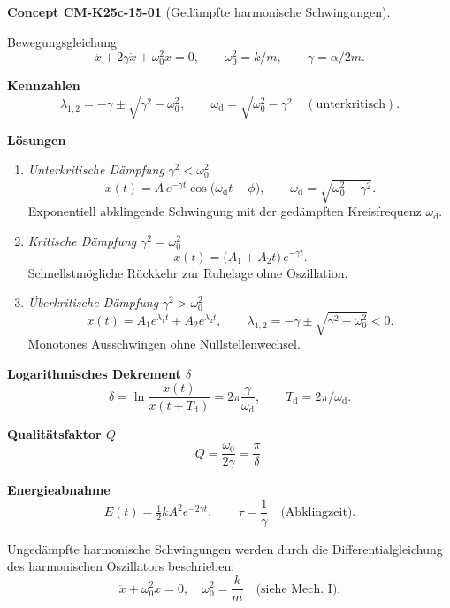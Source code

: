 \documentclass[10pt, letterpaper]{article}
\newcommand{\CustomHeading}[3]{%
  \par\medskip\noindent%
  \textbf{#1 #2} \textnormal{(#3)}.\enskip%
}
\newenvironment{CONC}[2]{\begin{unitbox}\CustomHeading{Concept}{#1}{#2}}{\end{unitbox}}
\begin{document}
\begin{CONC}{CM-K25c-15-01}{Gedämpfte harmonische Schwingungen}
Bewegungsgleichung  
\[
\ddot x + 2\gamma\dot x + \omega_{0}^{2}x = 0,
\qquad
\omega_{0}^{2}=k/m,
\qquad
\gamma=\alpha/2m .
\]

\textbf{Kennzahlen}  
\[
\lambda_{1,2}=-\gamma\pm\sqrt{\gamma^{2}-\omega_{0}^{2}},
\qquad
\omega_{\text{d}}=\sqrt{\omega_{0}^{2}-\gamma^{2}}\quad
(\text{unterkritisch}) .
\]

\textbf{Lösungen}

\begin{enumerate}
  \item \emph{Unterkritische Dämpfung} \(\gamma^{2}<\omega_{0}^{2}\)  
        \[
          x(t)=A\,e^{-\gamma t}\cos\!\bigl(\omega_{\mathrm d}t-\phi\bigr),
          \qquad
          \omega_{\mathrm d}=\sqrt{\omega_{0}^{2}-\gamma^{2}} .
        \]
        Exponentiell abklingende Schwingung mit der gedämpften Kreisfrequenz
        \(\omega_{\mathrm d}\).

  \item \emph{Kritische Dämpfung} \(\gamma^{2}=\omega_{0}^{2}\)  
        \[
          x(t)=\bigl(A_{1}+A_{2}t\bigr)\,e^{-\gamma t}.
        \]
        Schnellstmögliche Rückkehr zur Ruhelage ohne Oszillation.

  \item \emph{Überkritische Dämpfung} \(\gamma^{2}>\omega_{0}^{2}\)  
        \[
          x(t)=A_{1}e^{\lambda_{1}t}+A_{2}e^{\lambda_{2}t},
          \qquad
          \lambda_{1,2}=-\gamma\pm\sqrt{\gamma^{2}-\omega_{0}^{2}}<0 .
        \]
        Monotones Ausschwingen ohne Nullstellenwechsel.
\end{enumerate}


\textbf{Logarithmisches Dekrement \(\delta\)}  
\[
\delta=\ln\frac{x(t)}{x(t+T_{\text{d}})}
      =2\pi\frac{\gamma}{\omega_{\text{d}}},
\qquad
T_{\text{d}}=2\pi/\omega_{\text{d}} .
\]

\textbf{Qualitätsfaktor \(Q\)}  
\[
Q=\frac{\omega_{0}}{2\gamma}
  =\frac{\pi}{\delta}.
\]

\textbf{Energieabnahme}  
\[
E(t)=\tfrac12kA^{2}e^{-2\gamma t},
\qquad
\tau=\frac{1}{\gamma}\quad\text{(Abklingzeit)}.
\]
\end{CONC}






Ungedämpfte harmonische Schwingungen werden durch die Differentialgleichung des harmonischen Oszillators beschrieben:
\[\ddot{x} + \omega_0^2 x = 0, \quad \omega_0^2 = \frac{k}{m} \quad \text{(siehe Mech. I)}.\]
\end{document}
